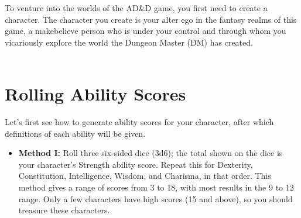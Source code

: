 \documentclass[../main.tex]{subfiles}
\begin{document}
	\begin{multicols}{3}
To venture into the worlds of the AD&D\textsuperscript{\textregistered} game, you first need to create a character. The character you create is your alter ego in the fantasy realms of this game, a makebelieve person who is under your control and through whom you vicariously explore the world the Dungeon Master (DM) has created.\\
\\

\section*{Rolling Ability Scores}
Let's first see how to generate ability scores for your character, after which definitions of each ability will be given.
\\
\begin{itemize}
\item \textbf{Method I:} Roll three six-sided dice (3d6); the total shown on the dice is your character’s Strength ability score. Repeat this for Dexterity, Constitution, Intelligence, Wisdom, and Charisma, in that order. This method gives a range of scores from 3 to 18, with most results in the 9 to 12 range. Only a few characters have high scores (15 and above), so you should treasure these characters.
\end{itemize}


\end{multicols}
\end{document}
